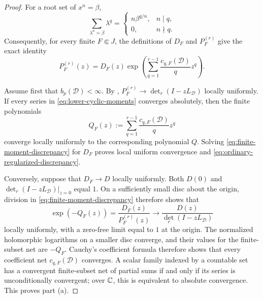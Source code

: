 \begin{proof}
  For a root set of \(x^n=\beta\),
  \[
    \sum_{\lambda^n=\beta}\lambda^q
    =\begin{cases}
       n\beta^{q/n},&n\mid q,\\
       0,&n\nmid q.
     \end{cases}
  \]
  Consequently, for every finite \(F\Subset J\), the definitions of
  \(D_F\) and \(P_F^{(r)}\) give the exact identity
  \begin{equation}\label{eq:finite-moment-discrepancy}
    P_F^{(r)}(z)
    =D_F(z)\exp\!\left(
       \sum_{q=1}^{r-1}\frac{c_{q,F}(\mathcal D)}{q}z^q\right).
  \end{equation}

  Assume first that \(b_p(\mathcal D)<\infty\).  By
  ,
  \(P_F^{(r)}\to\det_r(I-zL_{\mathcal D})\) locally uniformly.  If every
  series in \eqref{eq:lower-cyclic-moments} converges absolutely, then the
  finite polynomials
  \[
    Q_F(z):=\sum_{q=1}^{r-1}
             \frac{c_{q,F}(\mathcal D)}{q}z^q
  \]
  converge locally uniformly to the corresponding polynomial \(Q\).
  Solving \eqref{eq:finite-moment-discrepancy} for \(D_F\) proves local
  uniform convergence and \eqref{eq:ordinary-regularized-discrepancy}.

  Conversely, suppose that \(D_F\to D\) locally uniformly.  Both \(D(0)\)
  and \(\det_r(I-zL_{\mathcal D})|_{z=0}\) equal \(1\).  On a sufficiently
  small disc about the origin, division in
  \eqref{eq:finite-moment-discrepancy} therefore shows that
  \[
    \exp(-Q_F(z))
    =\frac{D_F(z)}{P_F^{(r)}(z)}
    \longrightarrow
    \frac{D(z)}{\det_r(I-zL_{\mathcal D})}
  \]
  locally uniformly, with a zero-free limit equal to \(1\) at the origin.
  The normalized holomorphic logarithms on a smaller disc converge, and their
  values for the finite-subset net are \(-Q_F\).  Cauchy's coefficient formula
  therefore shows that every coefficient net
  \(c_{q,F}(\mathcal D)\) converges.  A scalar family indexed by a countable
  set has a convergent finite-subset net of partial sums if and only if its
  series is unconditionally convergent; over \(\mathbb{C}\), this is equivalent to
  absolute convergence.  This proves part \textup{(a)}.


\end{proof}
